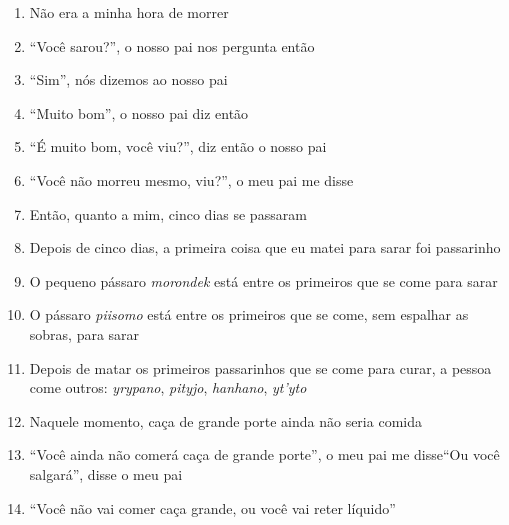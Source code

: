 \begin{enumerate}
 \item Não era a minha hora de morrer

 \begin{center}\end{center}

 \item ``Você sarou?'', o nosso pai nos pergunta então

 \item ``Sim'', nós dizemos ao nosso pai

 \item ``Muito bom'', o nosso pai diz então

 \item ``É muito bom, você viu?'', diz então o nosso pai

 \item ``Você não morreu mesmo, viu?'', o meu pai me disse

 \begin{center}\end{center}

 \item Então, quanto a mim, cinco dias se passaram

 \item Depois de cinco dias, a primeira coisa que eu matei para sarar foi
 passarinho

 \item O pequeno pássaro \textit{morondek} está entre os primeiros que se come
 para sarar

 \item O pássaro \textit{piisomo} está entre os primeiros que se come, sem
 espalhar as sobras, para sarar

 \item Depois de matar os primeiros passarinhos que se come para curar, a
 pessoa come outros: \textit{yrypano}, \textit{pityjo}, \textit{hanhano},
 \textit{yt'yto}

 \begin{center}\end{center}

 \item Naquele momento, caça de grande porte ainda não seria comida

 \item ``Você ainda não comerá caça de grande porte'', o meu pai me
 disse``Ou você salgará'', disse o meu pai

 \item ``Você não vai comer caça grande, ou você vai reter líquido''


\end{enumerate}
